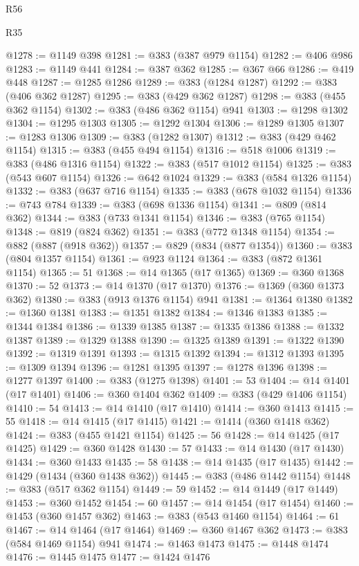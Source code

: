 \begin{lexlean}{R56}
\begin{lexlean}{R35}
\begin{coremodule}
{{{{{{{{{{{{{{{{{{{{{{{{{{{{{{{{{{{{{{{{{{{{{{{{{{{{@1278 := @1149 @398
@1281 := @383 (@387 @979 @1154)
@1282 := @406 @986
@1283 := @1149 @441
@1284 := @387 @362
@1285 := @367 @66
@1286 := @419 @448
@1287 := @1285 @1286
@1289 := @383 (@1284 @1287)
@1292 := @383 (@406 @362 @1287)
@1295 := @383 (@429 @362 @1287)
@1298 := @383 (@455 @362 @1154)
@1302 := @383 (@486 @362 @1154) @941
@1303 := @1298 @1302
@1304 := @1295 @1303
@1305 := @1292 @1304
@1306 := @1289 @1305
@1307 := @1283 @1306
@1309 := @383 (@1282 @1307)
@1312 := @383 (@429 @462 @1154)
@1315 := @383 (@455 @494 @1154)
@1316 := @518 @1006
@1319 := @383 (@486 @1316 @1154)
@1322 := @383 (@517 @1012 @1154)
@1325 := @383 (@543 @607 @1154)
@1326 := @642 @1024
@1329 := @383 (@584 @1326 @1154)
@1332 := @383 (@637 @716 @1154)
@1335 := @383 (@678 @1032 @1154)
@1336 := @743 @784
@1339 := @383 (@698 @1336 @1154)
@1341 := @809 (@814 @362)
@1344 := @383 (@733 @1341 @1154)
@1346 := @383 (@765 @1154)
@1348 := @819 (@824 @362)
@1351 := @383 (@772 @1348 @1154)
@1354 := @882 (@887 (@918 @362))
@1357 := @829 (@834 (@877 @1354))
@1360 := @383 (@804 @1357 @1154)
@1361 := @923 @1124
@1364 := @383 (@872 @1361 @1154)
@1365 := 51
@1368 := @14 @1365 (@17 @1365)
@1369 := @360 @1368
@1370 := 52
@1373 := @14 @1370 (@17 @1370)
@1376 := @1369 (@360 @1373 @362)
@1380 := @383 (@913 @1376 @1154) @941
@1381 := @1364 @1380
@1382 := @1360 @1381
@1383 := @1351 @1382
@1384 := @1346 @1383
@1385 := @1344 @1384
@1386 := @1339 @1385
@1387 := @1335 @1386
@1388 := @1332 @1387
@1389 := @1329 @1388
@1390 := @1325 @1389
@1391 := @1322 @1390
@1392 := @1319 @1391
@1393 := @1315 @1392
@1394 := @1312 @1393
@1395 := @1309 @1394
@1396 := @1281 @1395
@1397 := @1278 @1396
@1398 := @1277 @1397
@1400 := @383 (@1275 @1398)
@1401 := 53
@1404 := @14 @1401 (@17 @1401)
@1406 := @360 @1404 @362
@1409 := @383 (@429 @1406 @1154)
@1410 := 54
@1413 := @14 @1410 (@17 @1410)
@1414 := @360 @1413
@1415 := 55
@1418 := @14 @1415 (@17 @1415)
@1421 := @1414 (@360 @1418 @362)
@1424 := @383 (@455 @1421 @1154)
@1425 := 56
@1428 := @14 @1425 (@17 @1425)
@1429 := @360 @1428
@1430 := 57
@1433 := @14 @1430 (@17 @1430)
@1434 := @360 @1433
@1435 := 58
@1438 := @14 @1435 (@17 @1435)
@1442 := @1429 (@1434 (@360 @1438 @362))
@1445 := @383 (@486 @1442 @1154)
@1448 := @383 (@517 @362 @1154)
@1449 := 59
@1452 := @14 @1449 (@17 @1449)
@1453 := @360 @1452
@1454 := 60
@1457 := @14 @1454 (@17 @1454)
@1460 := @1453 (@360 @1457 @362)
@1463 := @383 (@543 @1460 @1154)
@1464 := 61
@1467 := @14 @1464 (@17 @1464)
@1469 := @360 @1467 @362
@1473 := @383 (@584 @1469 @1154) @941
@1474 := @1463 @1473
@1475 := @1448 @1474
@1476 := @1445 @1475
@1477 := @1424 @1476
}}}}}}}}}}}}}}}}}}}}}}}}}}}}}}}}}}}}}}}}}}}}}}}}}}}}
\end{coremodule}
\end{lexlean}
\end{lexlean}
